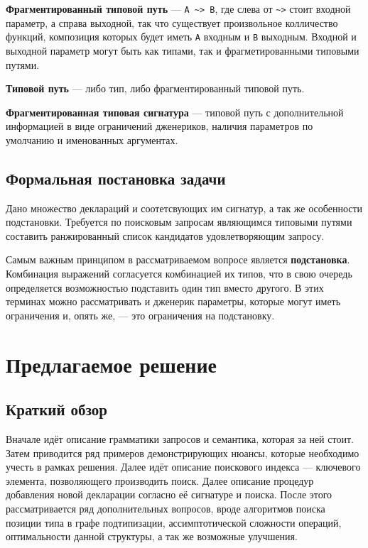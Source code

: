 \documentclass[times]{itmo-student-thesis}
\begin{document}
	\begin{definition}
		\textbf{Фрагментированный типовой путь} --- \lstinline{A ~> B}, где слева от \lstinline{~>} стоит входной параметр, а справа выходной, так что существует произвольное колличество функций, композиция которых будет иметь \lstinline{A} входным и  \lstinline{B} выходным. Входной и выходной параметр могут быть как типами, так и фрагметированными типовыми путями.
	\end{definition}
	
	\begin{definition}
		\textbf{Типовой путь} --- либо тип, либо фрагментированный типовой путь.
	\end{definition}
	
	\begin{definition}
		\textbf{Фрагментированная типовая сигнатура} --- типовой путь с дополнительной информацией в виде ограничений дженериков, наличия параметров по умолчанию и именованных аргументах.
	\end{definition}
	
	\section{Формальная постановка задачи}
	Дано множество деклараций и соотетсвующих им сигнатур, а так же особенности подстановки. Требуется по поисковым запросам являющимся типовыми путями составить ранжированный список кандидатов удовлетворяющим запросу.
	
	\chapterconclusion
	Самым важным принципом в рассматриваемом вопросе является \textbf{подстановка}. Комбинация выражений согласуется комбинацией их типов, что в свою очередь определяется возможностью подставить один тип вместо другого. В этих терминах можно рассматривать и дженерик параметры, которые могут иметь ограничения и, опять же, --- это ограничения на подстановку.
	
	\chapter{Предлагаемое решение}
	
	\section{Краткий обзор}
	Вначале идёт описание грамматики запросов и семантика, которая за ней стоит. Затем приводится ряд примеров демонстрирующих нюансы, которые необходимо учесть в рамках решения. Далее идёт описание поискового индекса --- ключевого элемента, позволяющего производить поиск. Далее описание процедур добавления новой декларации согласно её сигнатуре и поиска. После этого рассматривается ряд дополнительных вопросов, вроде алгоритмов поиска позиции типа в графе подтипизации, ассимптотической сложности операций, оптимальности данной структуры, а так же возможные улучшения.
	
\end{document}
